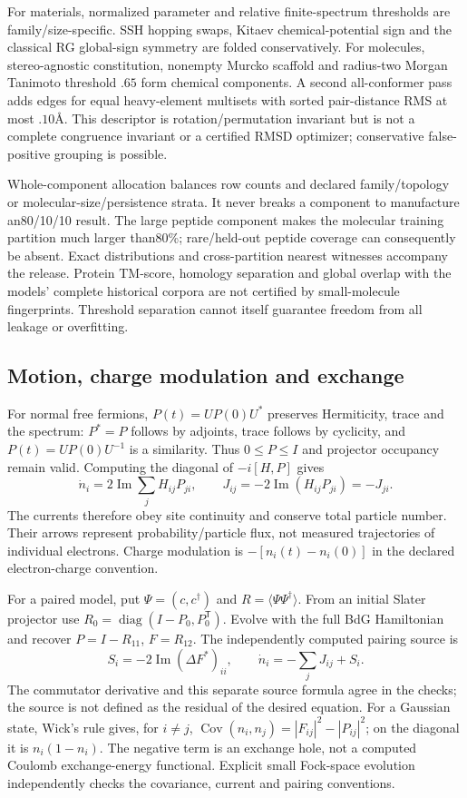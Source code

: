 \documentclass[11pt]{article}
\theoremstyle{definition}\newtheorem{definition}[theorem]{Definition}
\theoremstyle{remark}\newtheorem{remark}[theorem]{Remark}
\begin{document}
For materials, normalized parameter and relative finite-spectrum thresholds
are family/size-specific. SSH hopping swaps, Kitaev chemical-potential sign
and the classical RG global-sign symmetry are folded conservatively. For
molecules, stereo-agnostic constitution, nonempty Murcko scaffold and
radius-two Morgan Tanimoto threshold $.65$ form chemical components. A second
all-conformer pass adds edges for equal heavy-element multisets with sorted
pair-distance RMS at most $.10$\AA. This descriptor is rotation/permutation
invariant but is not a complete congruence invariant or a certified RMSD
optimizer; conservative false-positive grouping is possible.

Whole-component allocation balances row counts and declared family/topology
or molecular-size/persistence strata. It never breaks a component to manufacture
an80/10/10 result. The large peptide component makes the molecular training
partition much larger than80\%; rare/held-out peptide coverage can consequently
be absent. Exact distributions and cross-partition nearest witnesses accompany
the release. Protein TM-score, homology separation and global overlap with the
models' complete historical corpora are not certified by small-molecule
fingerprints. Threshold separation cannot itself guarantee freedom from all
leakage or overfitting.

\subsection{Motion, charge modulation and exchange}
For normal free fermions, $P(t)=UP(0)U^*$ preserves Hermiticity, trace and the
spectrum: $P^*=P$ follows by adjoints, trace follows by cyclicity, and
$P(t)=U P(0)U^{-1}$ is a similarity. Thus $0\leq P\leq I$ and projector
occupancy remain valid. Computing the diagonal of $-i[H,P]$ gives
\[
 \dot n_i=2\operatorname{Im}\sum_jH_{ij}P_{ji},\qquad
 J_{ij}=-2\operatorname{Im}(H_{ij}P_{ji})=-J_{ji}.
\]
The currents therefore obey site continuity and conserve total particle number.
Their arrows represent probability/particle flux, not measured trajectories of
individual electrons. Charge modulation is $-[n_i(t)-n_i(0)]$ in the declared
electron-charge convention.

For a paired model, put $\Psi=(c,c^\dagger)$ and
$R=\langle\Psi\Psi^\dagger\rangle$. From an initial Slater projector use
$R_0=\operatorname{diag}(I-P_0,P_0^{\mathsf T})$. Evolve with the full BdG
Hamiltonian and recover $P=I-R_{11}$, $F=R_{12}$.
The independently computed pairing source is
\[
 S_i=-2\operatorname{Im}(\Delta F^*)_{ii},\qquad
 \dot n_i=-\sum_jJ_{ij}+S_i.
\]
The commutator derivative and this separate source formula agree in the
checks; the source is not defined as the residual of the desired equation.
For a Gaussian state, Wick's rule gives, for $i\ne j$,
$\operatorname{Cov}(n_i,n_j)=|F_{ij}|^2-|P_{ij}|^2$; on the diagonal it is
$n_i(1-n_i)$. The negative term is an exchange hole, not a computed Coulomb
exchange-energy functional. Explicit small Fock-space evolution independently
checks the covariance, current and pairing conventions.
\end{document}
